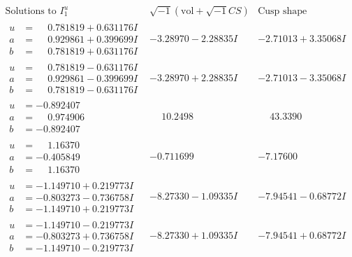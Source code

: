 \documentclass[1p]{elsarticle_modified}
\theoremstyle{definition}
\newcommand{\I}{\sqrt{-1}}
\begin{document}
$$\begin{array}{c|c|c}  
\text{Solutions to }I^u_{1}& \I (\text{vol} + \sqrt{-1}CS) & \text{Cusp shape}\\
 \hline 
\begin{aligned}
u &= \phantom{-}0.781819 + 0.631176 I \\
a &= \phantom{-}0.929861 + 0.399699 I \\
b &= \phantom{-}0.781819 + 0.631176 I\end{aligned}
 & -3.28970 - 2.28835 I & -2.71013 + 3.35068 I \\ \hline\begin{aligned}
u &= \phantom{-}0.781819 - 0.631176 I \\
a &= \phantom{-}0.929861 - 0.399699 I \\
b &= \phantom{-}0.781819 - 0.631176 I\end{aligned}
 & -3.28970 + 2.28835 I & -2.71013 - 3.35068 I \\ \hline\begin{aligned}
u &= -0.892407\phantom{ +0.000000I} \\
a &= \phantom{-}0.974906\phantom{ +0.000000I} \\
b &= -0.892407\phantom{ +0.000000I}\end{aligned}
 & \phantom{-}10.2498\phantom{ +0.000000I} & \phantom{-}43.3390\phantom{ +0.000000I} \\ \hline\begin{aligned}
u &= \phantom{-}1.16370\phantom{ +0.000000I} \\
a &= -0.405849\phantom{ +0.000000I} \\
b &= \phantom{-}1.16370\phantom{ +0.000000I}\end{aligned}
 & -0.711699\phantom{ +0.000000I} & -7.17600\phantom{ +0.000000I} \\ \hline\begin{aligned}
u &= -1.149710 + 0.219773 I \\
a &= -0.803273 - 0.736758 I \\
b &= -1.149710 + 0.219773 I\end{aligned}
 & -8.27330 - 1.09335 I & -7.94541 - 0.68772 I \\ \hline\begin{aligned}
u &= -1.149710 - 0.219773 I \\
a &= -0.803273 + 0.736758 I \\
b &= -1.149710 - 0.219773 I\end{aligned}
 & -8.27330 + 1.09335 I & -7.94541 + 0.68772 I \\ \hline\begin{aligned}

\end{aligned}
\end{array}$$
\end{document}
